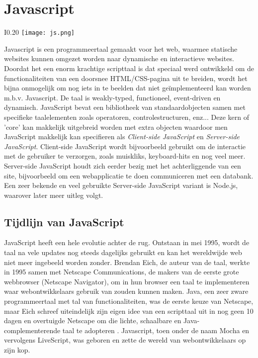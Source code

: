 \section{Javascript}
\label{sec:javascript}


\begin{wrapfigure}{I}{0.20\textwidth}
	\texttt{[image: js.png]}
\end{wrapfigure} Javascript is een programmeertaal gemaakt voor het web, waarmee statische websites kunnen omgezet worden naar dynamische en interactieve websites. Doordat het een enorm krachtige scripttaal is dat speciaal werd ontwikkeld om de functionaliteiten van een doorsnee HTML/CSS-pagina uit te breiden, wordt het bijna onmogelijk om nog iets in te beelden dat niet geïmplementeerd kan worden m.b.v. Javascript. De taal is weakly-typed, functioneel, event-driven en dynamisch. JavaScript bevat een bibliotheek van standaardobjecten samen met specifieke taalelementen zoals operatoren, controlestructuren, enz... Deze kern of 'core' kan makkelijk uitgebreid worden met extra objecten waardoor men JavaScript makkelijk kan specifieren als \textit{Client-side JavaScript} en \textit{Server-side JavaScript}. Client-side JavaScript wordt bijvoorbeeld gebruikt om de interactie met de gebruiker te verzorgen, zoals muiskliks, keyboard-hits en nog veel meer. Server-side JavaScript houdt zich eerder bezig met het achterliggende van een site, bijvoorbeeld om een webapplicatie te doen communiceren met een databank. Een zeer bekende en veel gebruikte Server-side JavaScript variant is Node.js, waarover later meer uitleg volgt. \autocite{Javascript2019}

\subsection{Tijdlijn van JavaScript}
\label{sec:jsTimeline}

JavaScript heeft een hele evolutie achter de rug. Ontstaan in mei 1995, wordt de taal na vele updates nog steeds dagelijks gebruikt en kan het wereldwijde web niet meer ingebeeld worden zonder. Brendan Eich, de auteur van de taal, werkte in 1995 samen met Netscape Communications, de makers van de eerste grote webbrowser (Netscape Navigator), om in hun browser een taal te implementeren waar webontwikkelaars gebruik van zouden kunnen maken. Java, een zeer zware programmeertaal met tal van functionaliteiten, was de eerste keuze van Netscape, maar Eich schreef uiteindelijk zijn eigen idee van een scripttaal uit in nog geen 10 dagen en overtuigde Netscape om die lichte, schaalbare en Java-complementerende taal te adopteren \autocite{Rangpariya2019}. Javascript, toen onder de naam Mocha en vervolgens LiveScript, was geboren en zette de wereld van webontwikkelaars op zijn kop.

